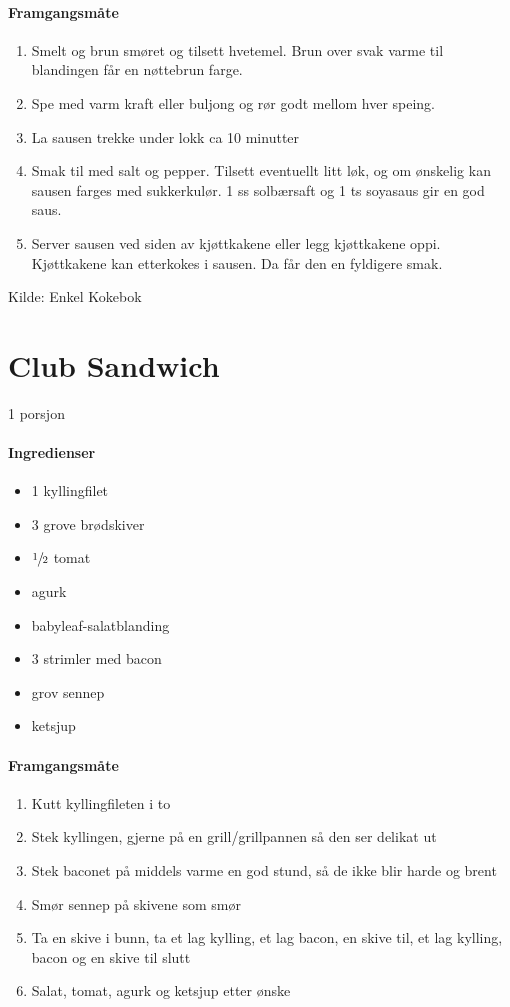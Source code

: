 \documentclass[12pt,a4paper]{book}
\begin{document}
\paragraph{Framgangsmåte}
\begin{enumerate}[noitemsep]
	\item Smelt og brun smøret og tilsett hvetemel. Brun over svak varme til blandingen får en nøttebrun farge.
	\item Spe med varm kraft eller buljong og rør godt mellom hver speing.
	\item La sausen trekke under lokk ca 10 minutter
	\item Smak til med salt og pepper. Tilsett eventuellt litt løk, og om ønskelig kan sausen farges med sukkerkulør. 1 ss solbærsaft og 1 ts soyasaus gir en god saus.
	\item Server sausen ved siden av kjøttkakene eller legg kjøttkakene oppi. Kjøttkakene kan etterkokes i sausen. Da får den en fyldigere smak.
\end{enumerate}

Kilde: Enkel Kokebok
\clearpage{}
\clearpage{}\section{﻿Club Sandwich}
1 porsjon

\paragraph{Ingredienser}
\begin{itemize}[noitemsep]
	\item 1 kyllingfilet
	\item 3 grove brødskiver
	\item $\sfrac{1}{2}$ tomat
	\item agurk
	\item babyleaf-salatblanding
	\item 3 strimler med bacon
	\item grov sennep
	\item ketsjup
\end{itemize}

\paragraph{Framgangsmåte}
\begin{enumerate}[noitemsep]
	\item Kutt kyllingfileten i to
	\item Stek kyllingen, gjerne på en grill/grillpannen så den ser delikat ut
	\item Stek baconet på middels varme en god stund, så de ikke blir harde og brent
	\item Smør sennep på skivene som smør
	\item Ta en skive i bunn, ta et lag kylling, et lag bacon, en skive til, et lag kylling, bacon og en skive til slutt
	\item Salat, tomat, agurk og ketsjup etter ønske
\end{enumerate}
\end{document}
